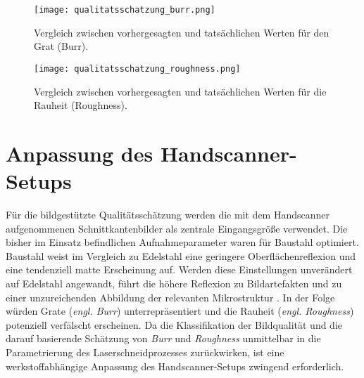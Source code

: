 \begin{figure}[h!]
    \centering
    \begin{minipage}{0.48\textwidth}
        \centering
        \texttt{[image: qualitatsschatzung\_burr.png]}
        \caption{Vergleich zwischen vorhergesagten und tatsächlichen Werten für den Grat (Burr).}
        \label{fig:burr_true_pred}
    \end{minipage}
    \hfill
    \begin{minipage}{0.48\textwidth}
        \centering
        \texttt{[image: qualitatsschatzung\_roughness.png]}
        \caption{Vergleich zwischen vorhergesagten und tatsächlichen Werten für die Rauheit (Roughness).}
        \label{fig:roughness_true_pred}
    \end{minipage}
\end{figure}



\newpage

\section{Anpassung des Handscanner-Setups}
\label{chap:handscanner-setup}

Für die bildgestützte Qualitätsschätzung werden die mit dem Handscanner aufgenommenen Schnittkantenbilder als zentrale Eingangsgröße verwendet. Die bisher im Einsatz befindlichen Aufnahmeparameter waren für Baustahl optimiert. Baustahl weist im Vergleich zu Edelstahl eine geringere Oberflächenreflexion und eine tendenziell matte Erscheinung auf. Werden diese Einstellungen unverändert auf Edelstahl angewandt, führt die höhere Reflexion zu Bildartefakten und zu einer unzureichenden Abbildung der relevanten Mikrostruktur \parencite{ZahnerStainlessReflect}. In der Folge würden Grate (\emph{engl. Burr}) unterrepräsentiert und die Rauheit (\emph{engl. Roughness}) potenziell verfälscht erscheinen. Da die Klassifikation der Bildqualität und die darauf basierende Schätzung von \emph{Burr} und \emph{Roughness} unmittelbar in die Parametrierung des Laserschneidprozesses zurückwirken, ist eine werkstoffabhängige Anpassung des Handscanner-Setups zwingend erforderlich.

